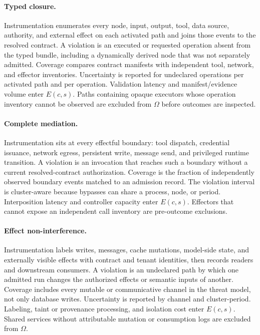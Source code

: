 \paragraph{Typed closure.}
Instrumentation enumerates every node, input, output, tool, data source, authority, and external effect on each activated path and joins those events to the resolved contract. A violation is an executed or requested operation absent from the typed bundle, including a dynamically derived node that was not separately admitted. Coverage compares contract manifests with independent tool, network, and effector inventories. Uncertainty is reported for undeclared operations per activated path and per operation. Validation latency and manifest/evidence volume enter $E(c,s)$. Paths containing opaque executors whose operation inventory cannot be observed are excluded from $\Omega$ before outcomes are inspected.

\paragraph{Complete mediation.}
Instrumentation sits at every effectful boundary: tool dispatch, credential issuance, network egress, persistent write, message send, and privileged runtime transition. A violation is an invocation that reaches such a boundary without a current resolved-contract authorization. Coverage is the fraction of independently observed boundary events matched to an admission record. The violation interval is cluster-aware because bypasses can share a process, node, or period. Interposition latency and controller capacity enter $E(c,s)$. Effectors that cannot expose an independent call inventory are pre-outcome exclusions.

\paragraph{Effect non-interference.}
Instrumentation labels writes, messages, cache mutations, model-side state, and externally visible effects with contract and tenant identities, then records readers and downstream consumers. A violation is an undeclared path by which one admitted run changes the authorized effects or semantic inputs of another. Coverage includes every mutable or communicative channel in the threat model, not only database writes. Uncertainty is reported by channel and cluster-period. Labeling, taint or provenance processing, and isolation cost enter $E(c,s)$. Shared services without attributable mutation or consumption logs are excluded from $\Omega$.


